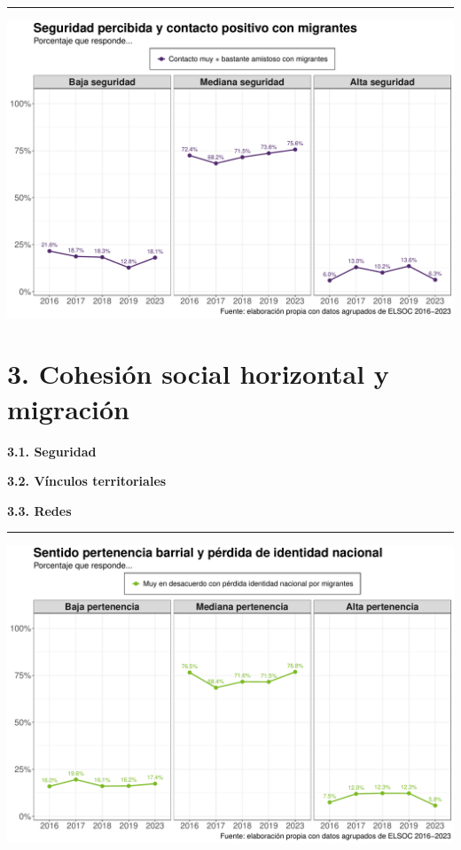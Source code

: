 \documentclass[
  spanish,
  letterpaper,
  DIV=11,
  numbers=noendperiod,
  oneside]{scrartcl}
\begin{document}
\begin{center}\rule{0.5\linewidth}{0.5pt}\end{center}

\begin{center}
\includegraphics[width=1\linewidth,height=\textheight,keepaspectratio]{cep_2025_files/figure-pdf/unnamed-chunk-6-1.pdf}
\end{center}

\section{3. Cohesión social horizontal y
migración}\label{cohesiuxf3n-social-horizontal-y-migraciuxf3n-2}

{\textbf{3.1. Seguridad}}

{\textbf{3.2. Vínculos territoriales}}

{\textbf{3.3. Redes}}

\begin{center}\rule{0.5\linewidth}{0.5pt}\end{center}

\begin{center}
\includegraphics[width=1\linewidth,height=\textheight,keepaspectratio]{cep_2025_files/figure-pdf/unnamed-chunk-7-1.pdf}
\end{center}
\end{document}
